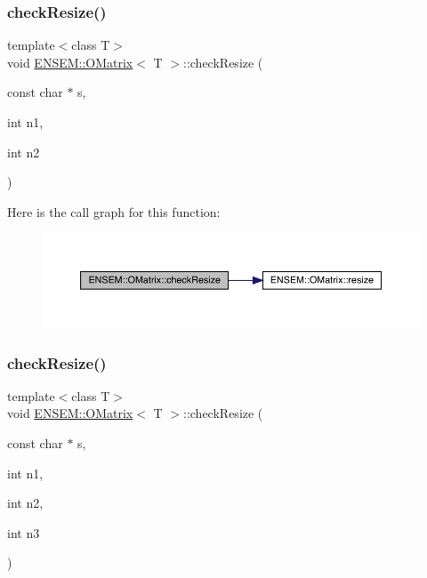 \subsubsection{\texorpdfstring{checkResize()}{checkResize()}\hspace{0.1cm}{\footnotesize\ttfamily [4/6]}}
{\footnotesize\ttfamily template$<$class T$>$ \\
void \mbox{\hyperlink{classENSEM_1_1OMatrix}{E\+N\+S\+E\+M\+::\+O\+Matrix}}$<$ T $>$\+::check\+Resize (\begin{DoxyParamCaption}\item[{const char $\ast$}]{s,  }\item[{int}]{n1,  }\item[{int}]{n2 }\end{DoxyParamCaption})\hspace{0.3cm}{\ttfamily [inline]}}

Here is the call graph for this function\+:
\nopagebreak
\begin{figure}[H]
\begin{center}
\leavevmode
\includegraphics[width=350pt]{dd/d80/classENSEM_1_1OMatrix_aa9d9ff7da2027f85535b36b472ef125b_cgraph}
\end{center}
\end{figure}
\mbox{\label{classENSEM_1_1OMatrix_a532d2138ecffc7a153b831401ca8b4df}} 
\subsubsection{\texorpdfstring{checkResize()}{checkResize()}\hspace{0.1cm}{\footnotesize\ttfamily [5/6]}}
{\footnotesize\ttfamily template$<$class T$>$ \\
void \mbox{\hyperlink{classENSEM_1_1OMatrix}{E\+N\+S\+E\+M\+::\+O\+Matrix}}$<$ T $>$\+::check\+Resize (\begin{DoxyParamCaption}\item[{const char $\ast$}]{s,  }\item[{int}]{n1,  }\item[{int}]{n2,  }\item[{int}]{n3 }\end{DoxyParamCaption})\hspace{0.3cm}{\ttfamily [inline]}}


